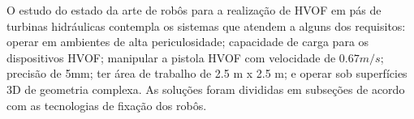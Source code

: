 O estudo do estado da arte de robôs para a realização de HVOF em pás de turbinas
hidráulicas contempla os sistemas que atendem a alguns dos requisitos: operar
em ambientes de alta periculosidade; capacidade de carga para os dispositivos HVOF;
manipular a pistola HVOF com velocidade de $0.67 m/s$; precisão de 5mm; ter
área de trabalho de 2.5 m x 2.5 m; e operar sob superfícies 3D de geometria
complexa. As soluções foram divididas em subseções de acordo com as tecnologias
de fixação dos robôs.


